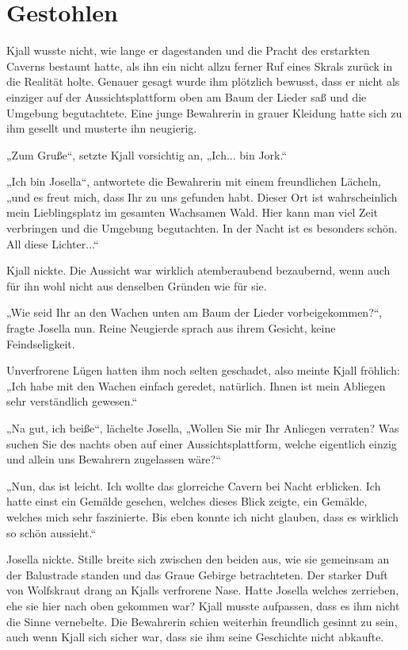 \documentclass[10pt, a4paper, oneside]{book}
\begin{document}
\newpage
\section{Gestohlen}

Kjall wusste nicht, wie lange er dagestanden und die Pracht des erstarkten Caverns bestaunt hatte, als ihn ein nicht allzu ferner Ruf eines Skrals zurück in die Realität holte. Genauer gesagt wurde ihm plötzlich bewusst, dass er nicht als einziger auf der Aussichtsplattform oben am Baum der Lieder saß und die Umgebung begutachtete. Eine junge Bewahrerin in grauer Kleidung hatte sich zu ihm gesellt und musterte ihn neugierig.

„Zum Gruße“, setzte Kjall vorsichtig an, „Ich... bin Jork.“

„Ich bin Josella“, antwortete die Bewahrerin mit einem freundlichen Lächeln, „und es freut mich, dass Ihr zu uns gefunden habt. Dieser Ort ist wahrscheinlich mein Lieblingsplatz im gesamten Wachsamen Wald. Hier kann man viel Zeit verbringen und die Umgebung begutachten. In der Nacht ist es besonders schön. All diese Lichter...“

Kjall nickte. Die Aussicht war wirklich atemberaubend bezaubernd, wenn auch für ihn wohl nicht aus denselben Gründen wie für sie.

„Wie seid Ihr an den Wachen unten am Baum der Lieder vorbeigekommen?“, fragte Josella nun. Reine Neugierde sprach aus ihrem Gesicht, keine Feindseligkeit.

Unverfrorene Lügen hatten ihm noch selten geschadet, also meinte Kjall fröhlich: „Ich habe mit den Wachen einfach geredet, natürlich. Ihnen ist mein Abliegen sehr verständlich gewesen.“

„Na gut, ich beiße“, lächelte Josella, „Wollen Sie mir Ihr Anliegen verraten? Was suchen Sie des nachts oben auf einer Aussichtsplattform, welche eigentlich einzig und allein uns Bewahrern zugelassen wäre?“

„Nun, das ist leicht. Ich wollte das glorreiche Cavern bei Nacht erblicken. Ich hatte einst ein Gemälde gesehen, welches dieses Blick zeigte, ein Gemälde, welches mich sehr faszinierte. Bis eben konnte ich nicht glauben, dass es wirklich so schön aussieht.“

Josella nickte. Stille breite sich zwischen den beiden aus, wie sie gemeinsam an der Balustrade standen und das Graue Gebirge betrachteten. Der starker Duft von Wolfskraut drang an Kjalls verfrorene Nase. Hatte Josella welches zerrieben, ehe sie hier nach oben gekommen war? Kjall musste aufpassen, dass es ihm nicht die Sinne vernebelte. Die Bewahrerin schien weiterhin freundlich gesinnt zu sein, auch wenn Kjall sich sicher war, dass sie ihm seine Geschichte nicht abkaufte.
\end{document}
